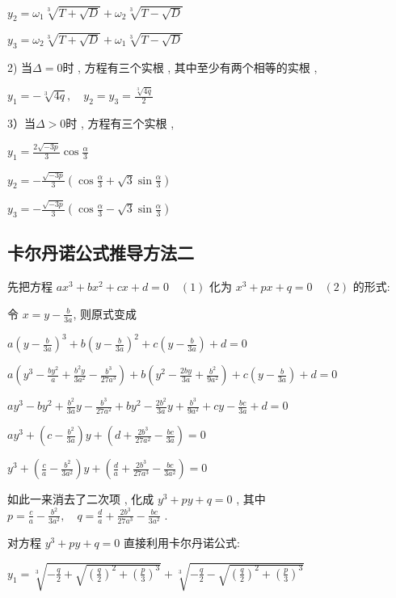 $y_{2}=\omega_1 \sqrt[3]{T+\sqrt{D}}+\omega_2 \sqrt[3]{T-\sqrt{D}}$

$y_{3}=\omega_2 \sqrt[3]{T+\sqrt{D}}+\omega_1 \sqrt[3]{T-\sqrt{D}}$

2) 当$\Delta=0$时 , 方程有三个实根 , 其中至少有两个相等的实根 , 

$y_1=-\sqrt[3]{4 q}, \quad y_2=y_3=\frac{\sqrt[3]{4 q}}{2}$

3）当$\Delta>0$时 , 方程有三个实根 , 

$y_{1}=\frac{2 \sqrt{-3 p}}{3} \cos \frac{\alpha}{3}$

$y_{2}=-\frac{\sqrt{-3 p}}{3}\left(\cos \frac{\alpha}{3}+\sqrt{3} \sin \frac{\alpha}{3}\right)$

$y_{3}=-\frac{\sqrt{-3 p}}{3}\left(\cos \frac{\alpha}{3}-\sqrt{3} \sin \frac{\alpha}{3}\right)$




\subsection{卡尔丹诺公式推导方法二}
先把方程 $a x^{3}+b x^{2}+c x+d=0 \quad (1)$ 
化为 $x^{3}+p x+q=0 \quad (2)$ 的形式:

令 $x=y-\frac{b}{3 a}$, 则原式变成

$a\left(y-\frac{b}{3 a}\right)^{3}+b\left(y-\frac{b}{3 a}\right)^{2}+c\left(y-\frac{b}{3 a}\right)+d=0$

$a\left(y^{3}-\frac{b y^{2}}{a}+\frac{b^{2} y}{3 a^{2}}-\frac{b^{3}}{27 a^{3}}\right)+b\left(y^{2}-\frac{2 b y}{3 a}+\frac{b^{2}}{9 a^{2}}\right)+c\left(y-\frac{b}{3 a}\right)+d=0$

$a y^{3}-b y^{2}+\frac{b^{2}}{3 a} y-\frac{b^{3}}{27 a^{2}}+b y^{2}-\frac{2 b^{2}}{3 a} y+\frac{b^{3}}{9 a^{2}}+c y-\frac{b c}{3 a}+d=0$

$a y^{3}+\left(c-\frac{b^{2}}{3 a}\right) y+\left(d+\frac{2 b^{3}}{27 a^{2}}-\frac{b c}{3 a}\right)=0$

$y^{3}+\left(\frac{c}{a}-\frac{b^{2}}{3 a^{2}}\right) y+\left(\frac{d}{a}+\frac{2 b^{3}}{27 a^{3}}-\frac{b c}{3 a^{2}}\right)=0$

如此一来消去了二次项 , 化成 $y^{3}+p y+q=0$  , 其中
$p=\frac{c}{a}-\frac{b^{2}}{3 a^{2}}, \quad q=\frac{d}{a}+\frac{2 b^{3}}{27 a^{3}}-\frac{b c}{3 a^{2}}$  . 

对方程 $y^{3}+p y+q=0$ 直接利用卡尔丹诺公式:

$y_{1}=\sqrt[3]{-\frac{q}{2}+\sqrt{\left(\frac{q}{2}\right)^{2}+\left(\frac{p}{3}\right)^{3}}}+\sqrt[3]{-\frac{q}{2}-\sqrt{\left(\frac{q}{2}\right)^{2}+\left(\frac{p}{3}\right)^{3}}}$

